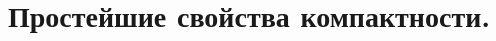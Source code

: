 \documentclass[geometry.tex]{subfiles}
\begin{document}
  \section{Простейшие свойства компактности.}
\end{document}
